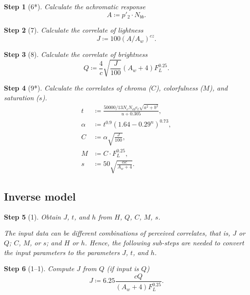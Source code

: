 \documentclass[twocolumn]{scrartcl}
\theoremstyle{named}
\newtheorem*{step}{Step}
\begin{document}
\begin{step}[6*]
Calculate the achromatic response
\[
  A\coloneqq p'_2 \cdot N_{bb}.
  \]
\end{step}

\begin{step}[7]
Calculate the correlate of lightness
\[
  J \coloneqq 100 {(A / A_w)}^{cz}.
\]
\end{step}

\begin{step}[8]
  Calculate the correlate of brightness
  \[
    Q \coloneqq \frac{4}{c} \sqrt{\frac{J}{100}} (A_w+4) F_L^{0.25}.
    \]
\end{step}

\begin{step}[9*]
Calculate the correlates of chroma ($C$), colorfulness ($M$), and saturation
  ($s$).
\begin{align*}
  t&\coloneqq \frac{50000/13 N_c N_{cb} e_t \sqrt{a^2 + b^2}}{u + 0.305},\\
  \alpha&\coloneqq t^{0.9} {(1.64 - 0.29^n)}^{0.73},\\
  C&\coloneqq \alpha \sqrt{\frac{J}{100}},\\
  M&\coloneqq C\cdot F_L^{0.25},\\
  s &\coloneqq 50 \sqrt{\frac{\alpha c}{A_w + 4}}.
\end{align*}
\end{step}

\subsection{Inverse model}

\begin{step}[1]
  Obtain $J$, $t$, and $h$ from $H$, $Q$, $C$, $M$, $s$.

  The input data can be different combinations of perceived correlates, that
  is, $J$ or $Q$; $C$, $M$, or $s$; and $H$ or $h$. Hence, the following
  sub-steps are needed to convert the input parameters to the parameters $J$,
  $t$, and $h$.
\end{step}

\begin{step}[1--1]
Compute $J$ from $Q$ (if input is $Q$)
\[
  J\coloneqq 6.25 \frac{cQ}{(A_w+4) F_L^{0.25}}.
\]
\end{step}
\end{document}
